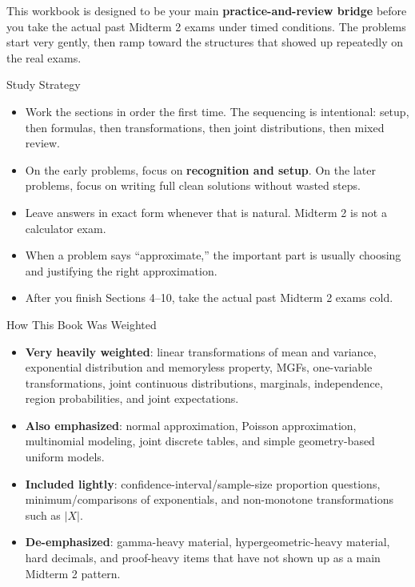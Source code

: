 \documentclass[12pt]{article}
\newcounter{problem}[section]
\begin{document}
This workbook is designed to be your main \textbf{practice-and-review bridge} before you take the actual past Midterm 2 exams under timed conditions. The problems start very gently, then ramp toward the structures that showed up repeatedly on the real exams.

\begin{summarybox}{Study Strategy}
\begin{itemize}
  \item Work the sections in order the first time. The sequencing is intentional: setup, then formulas, then transformations, then joint distributions, then mixed review.
  \item On the early problems, focus on \textbf{recognition and setup}. On the later problems, focus on writing full clean solutions without wasted steps.
  \item Leave answers in exact form whenever that is natural. Midterm 2 is not a calculator exam.
  \item When a problem says ``approximate,'' the important part is usually choosing and justifying the right approximation.
  \item After you finish Sections 4--10, take the actual past Midterm 2 exams cold.
\end{itemize}
\end{summarybox}

\begin{patternbox}{How This Book Was Weighted}
\begin{itemize}
  \item \textbf{Very heavily weighted}: linear transformations of mean and variance, exponential distribution and memoryless property, MGFs, one-variable transformations, joint continuous distributions, marginals, independence, region probabilities, and joint expectations.
  \item \textbf{Also emphasized}: normal approximation, Poisson approximation, multinomial modeling, joint discrete tables, and simple geometry-based uniform models.
  \item \textbf{Included lightly}: confidence-interval/sample-size proportion questions, minimum/comparisons of exponentials, and non-monotone transformations such as $|X|$.
  \item \textbf{De-emphasized}: gamma-heavy material, hypergeometric-heavy material, hard decimals, and proof-heavy items that have not shown up as a main Midterm 2 pattern.
\end{itemize}
\end{patternbox}
\end{document}
